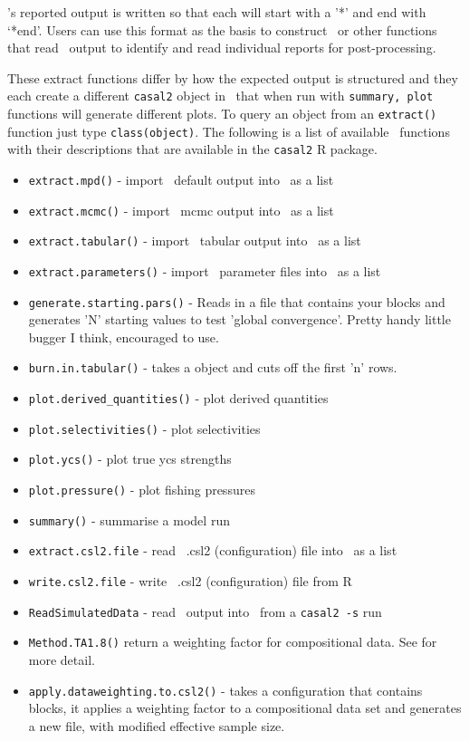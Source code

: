 \CNAME's reported output is written so that each  will start with a '*' and end with `*end'. Users can use this format as the basis to construct \R\ or other functions that read \CNAME\ output to identify and read individual reports for post-processing.


These extract functions differ by how the expected output is structured and they each create a different \texttt{casal2} object in \R\ that when run with \texttt{summary, plot} functions will generate different plots. To query an object from an \texttt{extract()} function just type \texttt{class(object)}. The following is a list of available \R\ functions with their descriptions that are available in the \texttt{casal2} R package.

\begin{itemize}
	\item \texttt{extract.mpd()} - import \CNAME\ default output into \R\ as a list
	\item \texttt{extract.mcmc()} - import \CNAME\ mcmc output into \R\ as a list
	\item \texttt{extract.tabular()} - import \CNAME\ tabular output into \R\ as a list
	\item \texttt{extract.parameters()} - import \CNAME\ parameter files into \R\ as a list
	\item \texttt{generate.starting.pars()} - Reads in a file that contains your  blocks and generates 'N' starting values to test 'global convergence'. Pretty handy little bugger I think, encouraged to use.
	\item \texttt{burn.in.tabular()} - takes a  object and cuts off the first 'n' rows.
	\item \texttt{plot.derived\_quantities()} - plot derived quantities
	\item \texttt{plot.selectivities()} - plot selectivities
	\item \texttt{plot.ycs()} - plot true ycs strengths
	\item \texttt{plot.pressure()} - plot fishing pressures
	\item \texttt{summary()} - summarise a model run
	\item \texttt{extract.csl2.file} - read \CNAME\ .csl2 (configuration) file into \R\ as a list
	\item \texttt{write.csl2.file} - write \CNAME\ .csl2 (configuration) file from R
	\item \texttt{ReadSimulatedData} - read \CNAME\ output into \R\ from a \texttt{casal2 -s} run
	\item \texttt{Method.TA1.8()} return a weighting factor for compositional data. See \cite{francis2011data} for more detail.
	\item \texttt{apply.dataweighting.to.csl2()} - takes a configuration that contains  blocks, it applies a weighting factor to a compositional data set and generates a new  file, with modified effective sample size.

\end{itemize}

